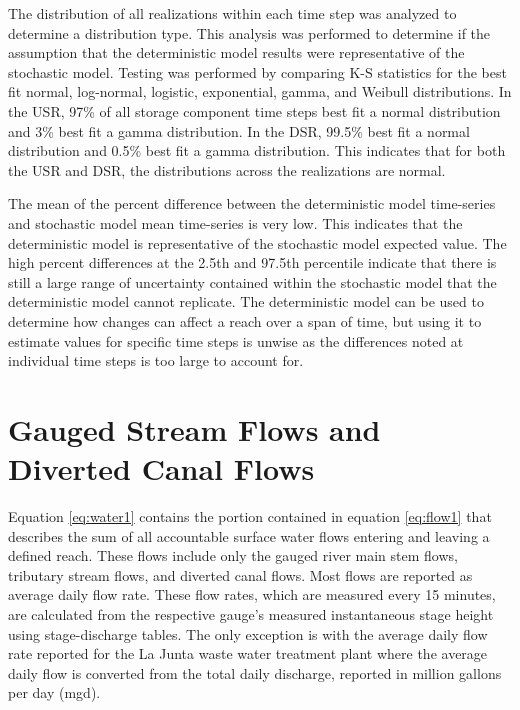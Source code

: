 \begin{linenumbers}
The distribution of all realizations within each time step was analyzed to determine a distribution type.  This analysis was performed to determine if the assumption that the deterministic model results were representative of the stochastic model.   Testing was performed by comparing K-S statistics for the best fit normal, log-normal, logistic, exponential, gamma, and Weibull distributions.  In the USR, 97\% of all storage component time steps best fit a normal distribution and 3\% best fit a gamma distribution.  In the DSR, 99.5\% best fit a normal distribution and 0.5\% best fit a gamma distribution.  This indicates that for both the USR and DSR, the distributions across the realizations are normal.

The mean of the percent difference between the deterministic model time-series and stochastic model mean time-series is very low.  This indicates that the deterministic model is representative of the stochastic model expected value.  The high percent differences at the 2.5th and 97.5th percentile indicate that there is still a large range of uncertainty contained within the stochastic model that the deterministic model cannot replicate.  The deterministic model can be used to determine how changes can affect a reach over a span of time, but using it to estimate values for specific time steps is unwise as the differences noted at individual time steps is too large to account for.
\clearpage

\section{Gauged Stream Flows and Diverted Canal Flows}
\label{sec:StreamFlows}

Equation \ref{eq:water1} contains the portion contained in equation \ref{eq:flow1} that describes the sum of all accountable surface water flows entering and leaving a defined reach.  These flows include only the gauged river main stem flows, tributary stream flows, and diverted canal flows.  Most flows are reported as average daily flow rate.  These flow rates, which are measured every 15 minutes, are calculated from the respective gauge's measured instantaneous stage height using stage-discharge tables.  The only exception is with the average daily flow rate reported for the La Junta waste water treatment plant where the average daily flow is converted from the total daily discharge, reported in million gallons per day (mgd).


\end{linenumbers}

